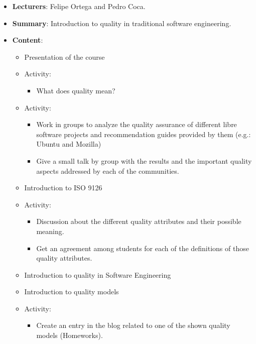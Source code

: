 \documentclass[a4paper]{article}
\begin{document}
\begin{itemize}
 \item \textbf{Lecturers}: Felipe Ortega and Pedro Coca.
 \item \textbf{Summary}: Introduction to quality in traditional software engineering.
 \item \textbf{Content}:

    \begin{itemize}
      \item Presentation of the course
      \item Activity:
        \begin{itemize}
          \item What does quality mean?
        \end{itemize}
      \item Activity:
        \begin{itemize}
          \item Work in groups to analyze the quality assurance of different 
          libre software projects and recommendation guides provided by them 
          (e.g.: Ubuntu and Mozilla)
          \item Give a small talk by group with the results and the important 
          quality aspects addressed by each of the communities.
        \end{itemize}
      \item Introduction to ISO 9126
      \item Activity:
        \begin{itemize}
          \item Discussion about the different quality attributes and their possible
          meaning.
          \item Get an agreement among students for each of the definitions of 
          those quality attributes.
        \end{itemize}
       \item Introduction to quality in Software Engineering
       \item Introduction to quality models
       \item Activity:
         \begin{itemize} 
           \item Create an entry in the blog related to one of the shown quality
           models (Homeworks).
         \end{itemize}
    \end{itemize}

   
\end{itemize}
\end{document}
